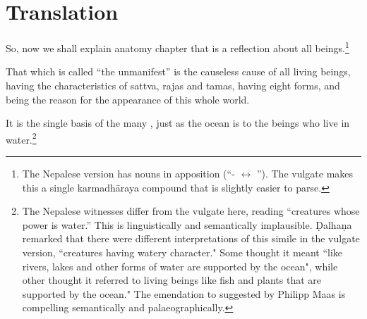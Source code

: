 \newpage

\section{Translation}

\begin{translation}
    
    \item [1] 
    
    So, now we shall explain anatomy chapter that is a reflection about all 
    beings.\footnote{The Nepalese version has nouns in apposition 
    (“- $\leftrightarrow$ ”).  The vulgate makes this a 
    single 
    karmadhāraya compound that is slightly easier to parse.} 
    
\item[3]


That which is called “the unmanifest” is the causeless cause of all living beings,  
having the characteristics of sattva, rajas and tamas, having eight forms, and 
being the reason for the appearance of this whole world.
    
It is the single basis of the many , just as the ocean is to the beings who live in
water.\footnote{The Nepalese witnesses differ from the vulgate here,
    reading  “creatures whose power is water.”  This is
    linguistically and semantically implausible. Ḍalhaṇa remarked that
    there were different interpretations of this simile in the vulgate
    version,  “creatures having watery character." Some
    thought it meant ``like rivers, lakes and other forms of water are
    supported by the ocean", while other thought it referred to living
    beings like fish and plants that are supported by the ocean." The
    emendation to  suggested by Philipp Maas is compelling
    semantically and palaeographically.}
    
\item[3.1.4]
\label{3.1.4}


\end{translation}
